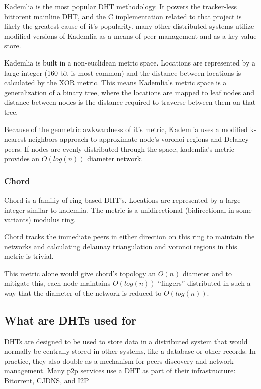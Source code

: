 \documentclass[conference]{IEEEtran}
\begin{document}
Kademlia is the most popular DHT methodology. 
It powers the tracker-less bittorent mainline DHT, and the C implementation related to that project is likely the greatest cause of it's popularity.
many other distributed systems utilize modified versions of Kademlia as a means of peer management and as a key-value store.

Kademlia is built in a non-euclidean metric space. 
Locations are represented by a large integer (160 bit is most common) and the distance between locations is calculated by the XOR metric.
This means Kademlia's metric space is a generalization of a binary tree, where the locations are mapped to leaf nodes and distance between nodes is the distance required to traverse between them on that tree.

Because of the geometric awkwardness of it's metric, Kademlia uses a modified k-nearest neighbors approach to approximate node's voronoi regions and Delaney peers.
If nodes are evenly distributed through the space, kademlia's metric provides an $O(log(n))$ diameter network.

\subsubsection{Chord}

Chord is a familiy of ring-based DHT's.
Locations are represented by a large integer similar to kademlia.
The metric is a unidirectional (bidirectional in some variants) modulus ring.

Chord tracks the immediate peers in either direction on this ring to maintain the networks and calculating delaunay triangulation and voronoi regions in this metric is trivial.

This metric alone would give chord's topology an $O(n)$ diameter 
and to mitigate this, each node maintains $O(log(n))$ ``fingers''
 distributed in such a way that the diameter of the network is reduced to $O(log(n))$.

\subsection{What are DHTs used for}

DHTs are designed to be used to store data in a distributed system that would normally be centrally stored in other systems, like a database or other records.
In practice, they also double as a mechanism for peers discovery and network management.
Many p2p services use a DHT as part of their infrastructure: Bitorrent\cite{jimenez2011kademlia}, CJDNS\cite{hodson2013meshnet}, and I2P\cite{zantout2011i2p}
\end{document}
